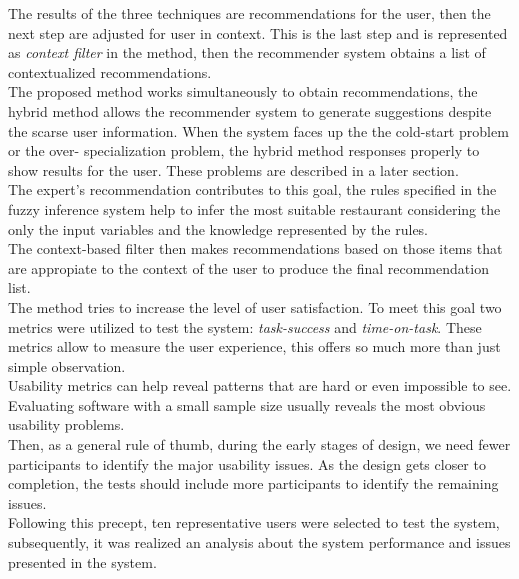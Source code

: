 The results of the three techniques are recommendations for the user,
then the next step are adjusted  for user in context. This is the last
step and is represented as \textit{context filter} in the method, then
the recommender system obtains a list of contextualized
recommendations. \\The proposed method works simultaneously to
obtain recommendations, the hybrid method allows the recommender
system to generate suggestions despite the scarse user information.
When the system faces up the the cold-start problem or the over-
specialization problem, the hybrid method responses properly to show
results for the user. These problems are described in a later
section. \\
The expert's recommendation contributes to this goal, the rules
specified in the fuzzy inference system help to infer the most
suitable restaurant considering the only the input variables and the
knowledge represented by the rules.\\ The context-based filter then
makes recommendations based on those items that are appropiate to the
context of the user to produce the final recommendation list. \\
The method tries to increase the  level of user satisfaction.
To meet this goal two metrics were utilized to test the system:
\textit{task-success} and \textit{time-on-task}. These metrics allow
to measure the user experience, this offers so much more than just
simple observation. \\Usability metrics can help reveal patterns that
are hard or even impossible to see. Evaluating software with a small
sample size usually reveals the most obvious usability
problems\cite{albert2013measuring}.\\
Then, as a general rule of thumb, during the early stages of design,
we need fewer participants to identify the major usability issues. As
the design gets closer to completion, the tests should include more
participants to identify the remaining issues\cite{albert2013measuring}.\\
Following this precept, ten representative users were selected to test 
the system, subsequently, it was realized an analysis about the 
system performance and issues presented in the system.\\
%
%
